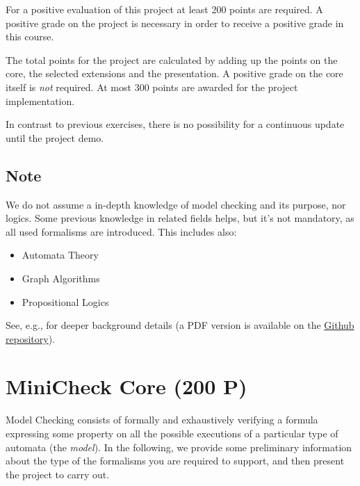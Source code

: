 \documentclass{article}
\begin{document}
For a positive evaluation of this project at least 200 points are required. 
A positive grade on the project is necessary in order to receive a positive grade in this course. 

The total points for the project are calculated by adding up the points on the core, 
the selected extensions and the presentation. A positive grade on the core itself is \textit{not} required. 
At most 300 points are awarded for the project implementation.

In contrast to previous exercises, there is no possibility for a continuous update until the project demo.

\subsection{Note}
We do not assume a in-depth knowledge of model checking and its purpose, nor logics.
Some previous knowledge in related fields helps, but it's not mandatory,
as all used formalisms are introduced. 
This includes also:
\begin{itemize}
    \item Automata Theory
    \item Graph Algorithms
    \item Propositional Logics
\end{itemize}
See, e.g., \cite{BaKa} for deeper background details (a PDF version is available on the 
\href{https://github.com/francescopont/MiniCheck.git}{Github repository}).

\section{MiniCheck Core (200 P)}

Model Checking consists of formally and exhaustively verifying a formula expressing some property
on all the possible executions of a particular type of automata (the \emph{model}). 
In the following, we provide some preliminary information 
about the type of the formalisms you are required to support, 
and then present the project to carry out. 
\end{document}
